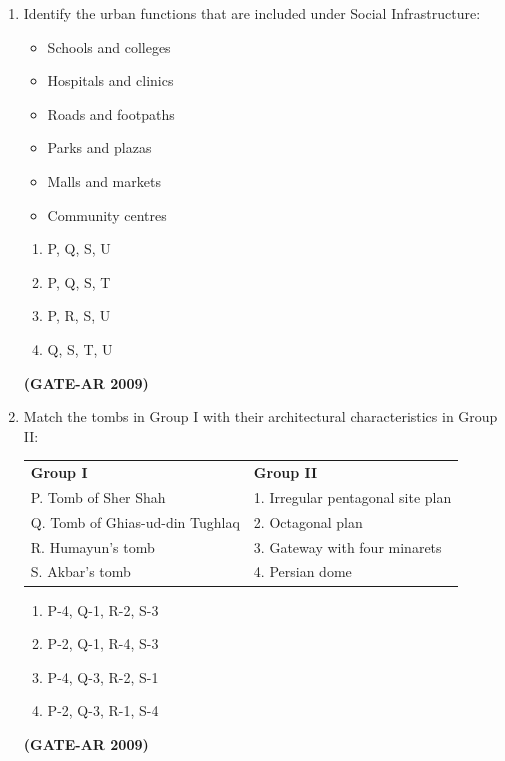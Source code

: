 \documentclass[a4paper,10pt]{article}
\begin{document}
\begin{enumerate}
    \item Identify the urban functions that are included under Social Infrastructure: 
    \begin{itemize}
        \item Schools and colleges
        \item Hospitals and clinics
        \item Roads and footpaths
        \item Parks and plazas
        \item Malls and markets
        \item Community centres
    \end{itemize}
    \begin{multicols}{4}
	\begin{enumerate}
        \item P, Q, S, U
        \item P, Q, S, T
        \item P, R, S, U
        \item Q, S, T, U
    \end{enumerate}
	\end{multicols}
    \hfill \textbf{(GATE-AR 2009)}

    \item Match the tombs in Group I with their architectural characteristics in Group II:  \\
    \begin{tabular}{ l l }
	\textbf{Group I} & \textbf{Group II} \\
	P. Tomb of Sher Shah & 1. Irregular pentagonal site plan \\
	Q. Tomb of Ghias-ud-din Tughlaq & 2. Octagonal plan \\
	R. Humayun’s tomb & 3. Gateway with four minarets \\
	S. Akbar’s tomb & 4. Persian dome \\
	\end{tabular}
	\begin{multicols}{2}
	\begin{enumerate}
        \item P-4, Q-1, R-2, S-3
        \item P-2, Q-1, R-4, S-3
        \item P-4, Q-3, R-2, S-1
        \item P-2, Q-3, R-1, S-4
    \end{enumerate}
	\end{multicols}
    \hfill \textbf{(GATE-AR 2009)}


\end{enumerate}
\end{document}
